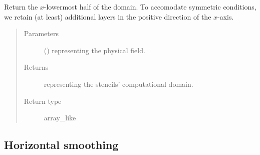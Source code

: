 \documentclass[letterpaper,10pt,english]{sphinxmanual}
\begin{document}
\begin{fulllineitems}
\begin{fulllineitems}
\end{fulllineitems}


\begin{fulllineitems}
\label{\detokenize{api:dycore.horizontal_boundary.RelaxedSymmetricYZ.from_physical_to_computational_domain}}
Return the \(x\)-lowermost half of the domain. To accomodate symmetric conditions,
we retain (at least)  additional layers in the positive direction of the \(x\)-axis.
\begin{quote}\begin{description}
\item[{Parameters}] \leavevmode
{} () \textendash{}  representing the physical field.

\item[{Returns}] \leavevmode
{} representing the stencils’ computational domain.

\item[{Return type}] \leavevmode
array\_like

\end{description}\end{quote}

\end{fulllineitems}


\end{fulllineitems}



\subsection{Horizontal smoothing}
\label{\detokenize{api:horizontal-smoothing}}
\end{document}
